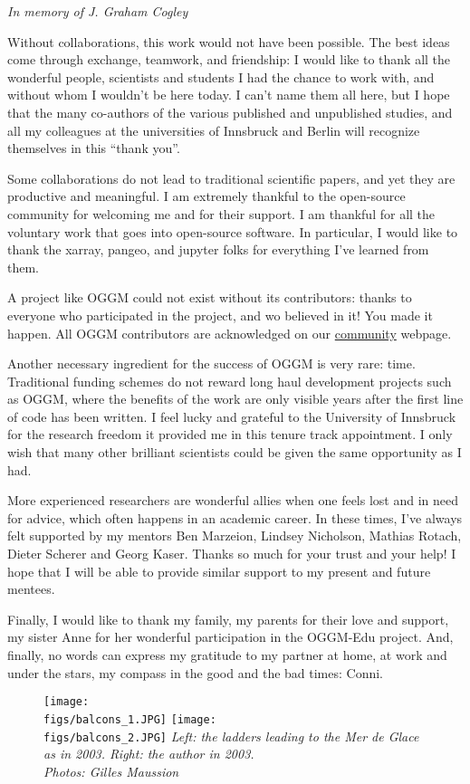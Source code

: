 
\textit{In memory of J. Graham Cogley}

\vspace{1cm}

Without collaborations, this work would not have been possible.
The best ideas come through exchange, teamwork, and friendship: I would like to
thank all the wonderful people, scientists and students I had the chance
to work with, and without whom I wouldn’t be here today. I can’t name them all here,
but I hope that the many co-authors of the various published and unpublished studies,
and all my colleagues at the universities of Innsbruck and Berlin will recognize themselves in this “thank you”.

Some collaborations do not lead to traditional scientific papers, and yet they
are productive and meaningful. I am extremely thankful
to the open-source community for welcoming me and for their support. I am thankful
for all the voluntary work that goes into open-source software. In particular,
I would like to thank the xarray, pangeo, and jupyter folks for everything
I’ve learned from them.

A project like OGGM could not exist without its contributors: thanks to everyone
who participated in the project, and wo believed in it! You made it happen.
All OGGM contributors are acknowledged on our \href{https://oggm.org/community}{community} webpage.

Another necessary ingredient for the success of OGGM is very rare: time.
Traditional funding schemes do not reward long haul development projects such as OGGM, where the benefits
of the work are only visible years after the first line of code has been written. I feel lucky and grateful
to the University of Innsbruck for the research freedom it provided me in this tenure track appointment.
I only wish that many other brilliant scientists could be given the same opportunity as I had.

More experienced researchers are wonderful allies when one feels lost and in need for advice,
which often happens in an academic career.
In these times, I’ve always felt supported by my mentors Ben Marzeion, Lindsey Nicholson,
Mathias Rotach, Dieter Scherer and Georg Kaser. Thanks so much for your trust and your help!
I hope that I will be able to provide similar support to my present and future mentees.

Finally, I would like to thank my family, my parents for their love and support, my sister Anne for her wonderful
participation in the OGGM-Edu project. And, finally, no words can express my gratitude to my partner
at home, at work and under the stars, my compass in the good and the bad times: Conni.

\vspace{1cm}

\begin{figure}[h]
\texttt{[image: \\figs/balcons\_1.JPG]}
\texttt{[image: \\figs/balcons\_2.JPG]}
\textit{Left: the ladders leading to the Mer de Glace as in 2003. Right: the author in 2003. \\
Photos: Gilles Maussion}
\end{figure}
